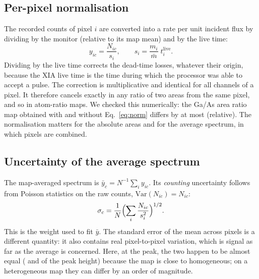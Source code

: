 \documentclass[11pt,a4paper]{article}
\begin{document}
\subsection{Per-pixel normalisation}
The recorded counts of pixel $i$ are converted into a rate per unit incident flux by dividing by the
monitor (relative to its map mean) and by the live time:
\begin{equation}
y_{ic} = \frac{N_{ic}}{s_i},\qquad s_i = \frac{m_i}{\bar m}\;t^{\mathrm{live}}_i .
\label{eq:norm}
\end{equation}
Dividing by the live time corrects the dead-time losses, whatever their origin, because the XIA live
time is the time during which the processor was able to accept a pulse. The correction is
multiplicative and identical for all channels of a pixel. It therefore cancels exactly in any ratio of
two areas from the same pixel, and so in atom-ratio maps. We checked this numerically: the Ga/As area
ratio map obtained with and without Eq.~\eqref{eq:norm} differs by at most \rInvariance{} (relative).
The normalisation matters for the absolute areas and for the average spectrum, in which pixels are
combined.

\subsection{Uncertainty of the average spectrum}
The map-averaged spectrum is $\bar y_c = N^{-1}\sum_i y_{ic}$. Its \emph{counting} uncertainty follows
from Poisson statistics on the raw counts, $\mathrm{Var}(N_{ic})=N_{ic}$:
\begin{equation}
\sigma_c = \frac{1}{N}\Bigl(\sum_i \frac{N_{ic}}{s_i^2}\Bigr)^{1/2}.
\label{eq:counting}
\end{equation}
This is the weight used to fit $\bar y$. The standard error of the mean across pixels is a different
quantity: it also contains real pixel-to-pixel variation, which is signal as far as the average is
concerned. Here, at the peak, the two happen to be almost equal (\rCntErrPeak{} and \rSemPeak{} of the peak height) because the map is close to homogeneous; on a heterogeneous map they can differ by an
order of magnitude.
\end{document}
